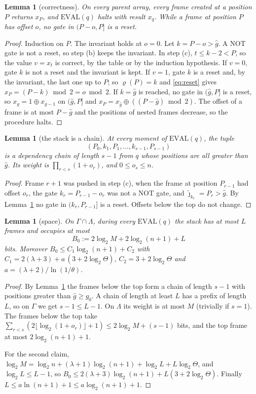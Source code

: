 \documentclass[11pt]{amsart}
\newtheorem{lemma}[theorem]{Lemma}
\theoremstyle{definition}
\theoremstyle{remark}
\newcommand{\jt}{\tilde{\jmath}}
\newcommand{\ghat}{\hat g}
\begin{document}
\begin{lemma}[correctness]\label{lem:correct}
On every parent array, every frame created at a position $P$ returns $x_P$, and
$\mathrm{EVAL}(q)$ halts with result $x_q$. While a frame at position $P$ has offset $o$, no gate
in $(P-o,P]$ is a reset.
\end{lemma}

\begin{proof}
Induction on $P$. The invariant holds at $o=0$. Let $k=P-o>\ghat$. A NOT gate is not a reset, so
step (b) keeps the invariant. In step (c), $t\le k-2<P$, so the value $v=x_t$ is correct, by the
table or by the induction hypothesis. If $v=0$, gate $k$ is not a reset and the invariant is
kept. If $v=1$, gate $k$ is a reset and, by the invariant, the last one up to $P$; so
$\varrho(P)=k$ and \eqref{eq:reset} gives $x_P=(P-k)\bmod2=o\bmod2$. If $k=\ghat$ is reached, no
gate in $(\ghat,P]$ is a reset, so $x_g=1\oplus x_{g-1}$ on $(\ghat,P]$ and
$x_P=x_{\ghat}\oplus((P-\ghat)\bmod2)$. The offset of a frame is at most $P-\ghat$ and the
positions of nested frames decrease, so the procedure halts.
\end{proof}

\begin{lemma}[the stack is a chain]\label{lem:stackchain}
At every moment of $\mathrm{EVAL}(q)$, the tuple
\[
(P_0,k_1,P_1,\dots,k_{s-1},P_{s-1})
\]
is a dependency chain of length $s-1$ from $q$ whose positions are all greater than $\ghat$. Its
weight is $\prod_{r<s}(1+o_r)$, and $0\le o_s\le n$.
\end{lemma}

\begin{proof}
Frame $r+1$ was pushed in step (c), when the frame at position $P_{r-1}$ had offset $o_r$, the gate
$k_r=P_{r-1}-o_r$ was not a NOT gate, and $\jt_{k_r}=P_r>\ghat$. By Lemma~\ref{lem:correct} no gate in
$(k_r,P_{r-1}]$ is a reset. Offsets below the top do not change.
\end{proof}

\begin{lemma}[space]\label{lem:space}
On $\Gamma\cap\Lambda$, during every $\mathrm{EVAL}(q)$ the stack has at most $L$ frames and occupies
at most
\[
B_0:=2\log_2M+2\log_2(n+1)+L
\]
bits. Moreover $B_0\le C_1\log_2(n+1)+C_2$ with
$C_1=2(\lambda+3)+a\,(3+2\log_2\Theta)$, $C_2=3+2\log_2\Theta$ and $a=(\lambda+2)/\ln(1/\theta)$.
\end{lemma}

\begin{proof}
By Lemma~\ref{lem:stackchain} the frames below the top form a chain of length $s-1$ with positions
greater than $\ghat\ge g_0$. A chain of length at least $L$ has a prefix of length $L$, so on
$\Gamma$ we get $s-1\le L-1$. On $\Lambda$ its weight is at most $M$ (trivially if $s=1$). The
frames below the top take $\sum_{r<s}(2\lfloor\log_2(1+o_r)\rfloor+1)\le2\log_2M+(s-1)$ bits, and
the top frame at most $2\log_2(n+1)+1$.

For the second claim, $\log_2M=\log_2n+(\lambda+1)\log_2(n+1)+\log_2L+L\log_2\Theta$, and
$\log_2L\le L-1$, so $B_0\le2(\lambda+3)\log_2(n+1)+L(3+2\log_2\Theta)$. Finally
$L\le a\ln(n+1)+1\le a\log_2(n+1)+1$.
\end{proof}
\end{document}
